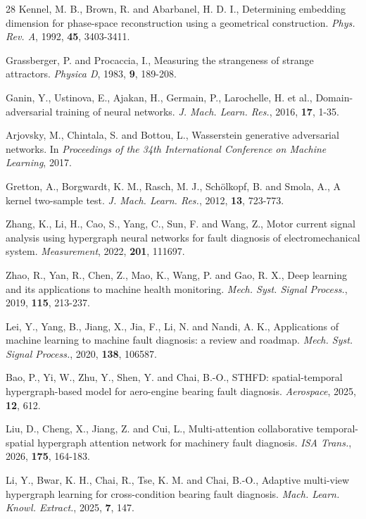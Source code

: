 \begin{thebibliography}{28}
 Kennel, M. B., Brown, R. and Abarbanel, H. D. I., Determining embedding dimension for phase-space reconstruction using a geometrical construction. \textit{Phys. Rev. A}, 1992, \textbf{45}, 3403-3411.

 Grassberger, P. and Procaccia, I., Measuring the strangeness of strange attractors. \textit{Physica D}, 1983, \textbf{9}, 189-208.

 Ganin, Y., Ustinova, E., Ajakan, H., Germain, P., Larochelle, H. et al., Domain-adversarial training of neural networks. \textit{J. Mach. Learn. Res.}, 2016, \textbf{17}, 1-35.

 Arjovsky, M., Chintala, S. and Bottou, L., Wasserstein generative adversarial networks. In \textit{Proceedings of the 34th International Conference on Machine Learning}, 2017.

 Gretton, A., Borgwardt, K. M., Rasch, M. J., Sch\"olkopf, B. and Smola, A., A kernel two-sample test. \textit{J. Mach. Learn. Res.}, 2012, \textbf{13}, 723-773.

 Zhang, K., Li, H., Cao, S., Yang, C., Sun, F. and Wang, Z., Motor current signal analysis using hypergraph neural networks for fault diagnosis of electromechanical system. \textit{Measurement}, 2022, \textbf{201}, 111697.

 Zhao, R., Yan, R., Chen, Z., Mao, K., Wang, P. and Gao, R. X., Deep learning and its applications to machine health monitoring. \textit{Mech. Syst. Signal Process.}, 2019, \textbf{115}, 213-237.

 Lei, Y., Yang, B., Jiang, X., Jia, F., Li, N. and Nandi, A. K., Applications of machine learning to machine fault diagnosis: a review and roadmap. \textit{Mech. Syst. Signal Process.}, 2020, \textbf{138}, 106587.

 Bao, P., Yi, W., Zhu, Y., Shen, Y. and Chai, B.-O., STHFD: spatial-temporal hypergraph-based model for aero-engine bearing fault diagnosis. \textit{Aerospace}, 2025, \textbf{12}, 612.

 Liu, D., Cheng, X., Jiang, Z. and Cui, L., Multi-attention collaborative temporal-spatial hypergraph attention network for machinery fault diagnosis. \textit{ISA Trans.}, 2026, \textbf{175}, 164-183.

 Li, Y., Bwar, K. H., Chai, R., Tse, K. M. and Chai, B.-O., Adaptive multi-view hypergraph learning for cross-condition bearing fault diagnosis. \textit{Mach. Learn. Knowl. Extract.}, 2025, \textbf{7}, 147.


\end{thebibliography}
